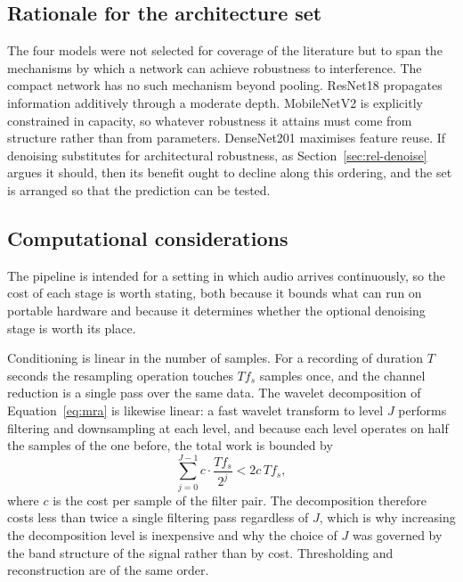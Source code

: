 \subsection{Rationale for the architecture set}\label{sec:d-why}

The four models were not selected for coverage of the literature but to span
the mechanisms by which a network can achieve robustness to interference. The
compact network has no such mechanism beyond pooling. ResNet18 propagates
information additively through a moderate depth. MobileNetV2 is explicitly
constrained in capacity, so whatever robustness it attains must come from
structure rather than from parameters. DenseNet201 maximises feature reuse.
If denoising substitutes for architectural robustness, as
Section~\ref{sec:rel-denoise} argues it should, then its benefit ought to
decline along this ordering, and the set is arranged so that the prediction
can be tested.

\subsection{Computational considerations}\label{sec:d-cost}

The pipeline is intended for a setting in which audio arrives continuously, so
the cost of each stage is worth stating, both because it bounds what can run
on portable hardware and because it determines whether the optional denoising
stage is worth its place.

Conditioning is linear in the number of samples. For a recording of duration
$T$ seconds the resampling operation touches $T f_s$ samples once, and the
channel reduction is a single pass over the same data. The wavelet
decomposition of Equation~\eqref{eq:mra} is likewise linear: a fast wavelet
transform to level $J$ performs filtering and downsampling at each level, and
because each level operates on half the samples of the one before, the total
work is bounded by
\begin{equation}
\sum_{j=0}^{J-1} c \cdot \frac{T f_s}{2^{j}} < 2 c \, T f_s,
\label{eq:cost-dwt}
\end{equation}
where $c$ is the cost per sample of the filter pair. The decomposition
therefore costs less than twice a single filtering pass regardless of $J$,
which is why increasing the decomposition level is inexpensive and why the
choice of $J$ was governed by the band structure of the signal rather than by
cost. Thresholding and reconstruction are of the same order.

